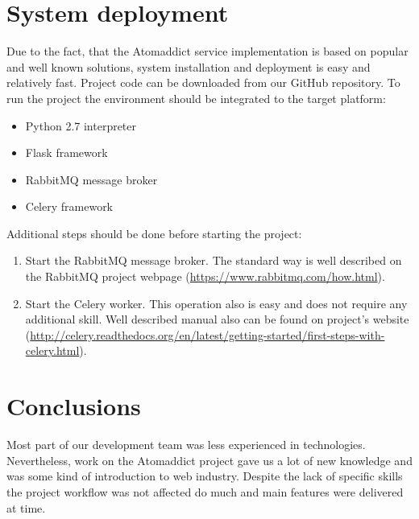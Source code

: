 \documentclass[12pt]{article}
\begin{document}
\section{System deployment}

Due to the fact, that the Atomaddict service implementation is based on popular and well known solutions, system installation and deployment is easy and relatively fast.
Project code can be downloaded from our GitHub repository.
To run the project the environment should be integrated to the target platform:

\begin{itemize}

    \item Python 2.7 interpreter

    \item Flask framework

    \item RabbitMQ message broker

    \item Celery framework

\end{itemize}


Additional steps should be done before starting the project:

\begin{enumerate}

    \item Start the RabbitMQ message broker. The standard way is well described on the RabbitMQ project webpage (\url{https://www.rabbitmq.com/how.html}).

    \item Start the Celery worker. This operation also is easy and does not require any additional skill. Well described manual also can be found on project's website (\url{http://celery.readthedocs.org/en/latest/getting-started/first-steps-with-celery.html}).

\end{enumerate}




\section{Conclusions}

Most part of our development team was less experienced in technologies. Nevertheless, work on the Atomaddict project gave us a lot of new knowledge and was some kind of introduction to web industry.
Despite the lack of specific skills the project workflow was not affected do much and main features were delivered at time.

\newpage
\tableofcontents



\end{document}
